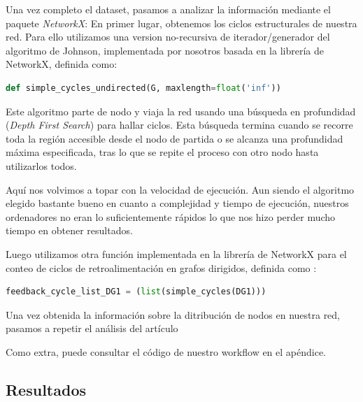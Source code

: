 \documentclass[1p]{elsarticle}
\begin{document}
    Una vez completo el dataset, pasamos a analizar la información mediante el paquete \textit{NetworkX}:
	 En primer lugar, obtenemos los ciclos estructurales de nuestra red. Para ello utilizamos una version no-recursiva de iterador/generador del algoritmo de Johnson, implementada por nosotros basada en la librería de NetworkX, definida como:
\begin{lstlisting}[language=Python]
    def simple_cycles_undirected(G, maxlength=float('inf'))
\end{lstlisting}
    Este algoritmo parte de nodo y viaja la red usando una búsqueda en profundidad (\textit{Depth First Search}) para hallar ciclos. Esta búsqueda termina cuando se recorre toda la región accesible desde el nodo de partida o se alcanza una profundidad máxima especificada, tras lo que se repite el proceso con otro nodo hasta utilizarlos todos.

    Aquí nos volvimos a topar con la velocidad de ejecución.
    Aun siendo el algoritmo elegido bastante bueno en cuanto a complejidad y tiempo de ejecución, nuestros ordenadores no eran lo suficientemente rápidos lo que nos hizo perder mucho tiempo en obtener resultados.

    Luego utilizamos otra función implementada en la librería de NetworkX para el conteo de ciclos de retroalimentación en grafos dirigidos, definida como :

\begin{lstlisting}[language=Python]
    feedback_cycle_list_DG1 = (list(simple_cycles(DG1)))
\end{lstlisting}

    Una vez obtenida la información sobre la ditribución de nodos en nuestra red, pasamos a repetir el análisis del artículo 

    Como extra, puede consultar el código de nuestro workflow en el apéndice.


\subsection{Resultados}
\end{document}

